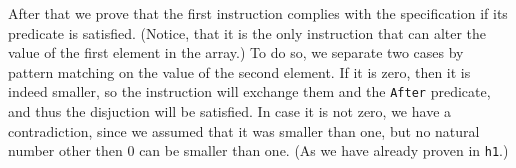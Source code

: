 After that we prove that the first instruction complies with the specification if its predicate is satisfied. (Notice, that it is the only instruction that can alter the value of the first element in the array.)
To do so, we separate two cases by pattern matching on the value of the second element. If it is zero, then it is indeed smaller, so the instruction will exchange them and the \verb|After| predicate, and thus the disjuction will be satisfied. In case it is not zero, we have a contradiction, since we assumed that it was smaller than one, but no natural number other then $0$ can be smaller than one. (As we have already proven in \verb|h1|.)

\begin{code}
    \>[0]\AgdaSpace{}%
    \AgdaSymbol{:}\<%
    \\
    \>[0][@{}l@{\AgdaIndent{0}}]%
    \>[2]\AgdaSymbol{(}\AgdaSpace{}%
    \AgdaSpace{}%
    \AgdaSymbol{(}\AgdaSpace{}%
    \AgdaSpace{}%
    \AgdaSpace{}%
    \AgdaSymbol{))}\AgdaSpace{}%
    \<%
    \\
    \>[2]\AgdaSpace{}%
    \AgdaSpace{}%
    \AgdaSpace{}%
    \AgdaSpace{}%
    \AgdaSpace{}%
    \<%
    \\
    \>[2]\AgdaSpace{}%
    \AgdaSpace{}%
    \AgdaSpace{}%
    \AgdaSpace{}%
    \AgdaSpace{}%
    \AgdaSpace{}%
    \AgdaSymbol{(}\AgdaSpace{}%
    \AgdaSpace{}%
    \AgdaSymbol{)}\<%
    \\
    \>[0]\AgdaSpace{}%
    \AgdaSymbol{\{}\AgdaSymbol{\}}\AgdaSpace{}%
    \AgdaSymbol{(}\AgdaSpace{}%
    \AgdaOperator{\AgdaInductiveConstructor{,}}\AgdaSpace{}%
    \AgdaSymbol{)}\AgdaSpace{}%
    \AgdaSpace{}%
    \AgdaSpace{}%
    \AgdaSymbol{(}\AgdaSpace{}%
    \AgdaSymbol{(}\AgdaSpace{}%
    \AgdaSymbol{)}\AgdaSpace{}%
    \AgdaSymbol{)}\<%
    \\

\end{code}

